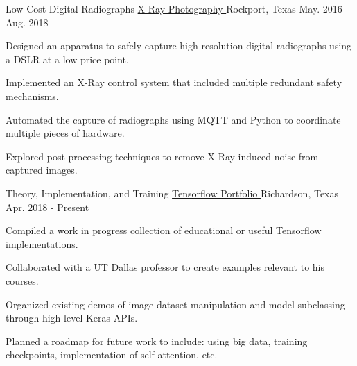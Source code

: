 

\begin{cventries}
  \cventry
    {Low Cost Digital Radiographs} %
		{
			\href{https://github.com/TidalPaladin/xray-controller.git}
			{X-Ray Photography \faGithubSquare}
		} %
    {Rockport, Texas} %
    {May. 2016 - Aug. 2018} %
	{
	\begin{cvitems}
		\item {
			Designed an apparatus to safely capture high resolution
			digital radiographs using a DSLR at
			a low price point.
		}
		\item {
			Implemented an X-Ray control system that included multiple
			redundant safety mechanisms.
		}
		\item {
			Automated the capture of radiographs using MQTT and Python
			to coordinate multiple pieces of hardware.
		}
		\item {
			Explored post-processing techniques to remove X-Ray induced
			noise from captured images.
		}
	\end{cvitems}
	}

  \cventry
  	{Theory, Implementation, and Training} %
		{
			\href{https://github.com/TidalPaladin/tensorflow-demos}
			{Tensorflow Portfolio \faGithubSquare}
		} %
    {Richardson, Texas} %
  	{Apr. 2018 - Present} %
	{
	\begin{cvitems}
		\item {
			Compiled a work in progress collection of educational or useful
			Tensorflow implementations.
		}
		\item {
			Collaborated with a UT Dallas professor to create examples
			relevant to his courses.
		}
		\item {
			Organized existing demos of image dataset manipulation and model
			subclassing through high level Keras APIs.
		}
		\item {
			Planned a roadmap for future work to include: using big data,
			training checkpoints, implementation of self attention, etc.
		}
	\end{cvitems}
	}


\end{cventries}
